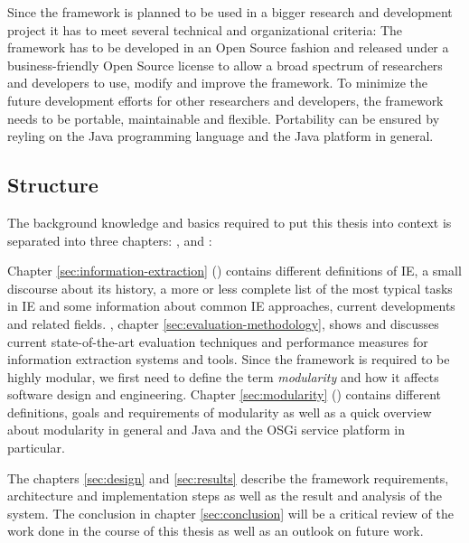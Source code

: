 Since the framework is planned to be used in a bigger research and development project it has to meet several technical and organizational criteria: The framework has to be developed in an Open Source fashion and released under a business-friendly Open Source license to allow a broad spectrum of researchers and developers to use, modify and improve the framework. To minimize the future development efforts for other researchers and developers, the framework needs to be portable, maintainable and flexible. Portability can be ensured by reyling on the Java programming language and the Java platform in general.

\subsection{Structure}
The background knowledge and basics required to put this thesis into context is separated into three chapters: ,  and :

Chapter \ref{sec:information-extraction} () contains different definitions of \gls{IE}, a small discourse about its history, a more or less complete list of the most typical tasks in \gls{IE} and some information about common \gls{IE} approaches, current developments and related fields. , chapter \ref{sec:evaluation-methodology}, shows and discusses current state-of-the-art evaluation techniques and performance measures for information extraction systems and tools. Since the framework is required to be highly modular, we first need to define the term \textit{modularity} and how it affects software design and engineering. Chapter \ref{sec:modularity} () contains different definitions, goals and requirements of modularity as well as a quick overview about modularity in general and Java and the \gls{OSGi} service platform in particular.

The chapters \ref{sec:design}  and \ref{sec:results}  describe the framework requirements, architecture and implementation steps as well as the result and analysis of the system. The conclusion in chapter \ref{sec:conclusion} will be a critical review of the work done in the course of this thesis as well as an outlook on future work.